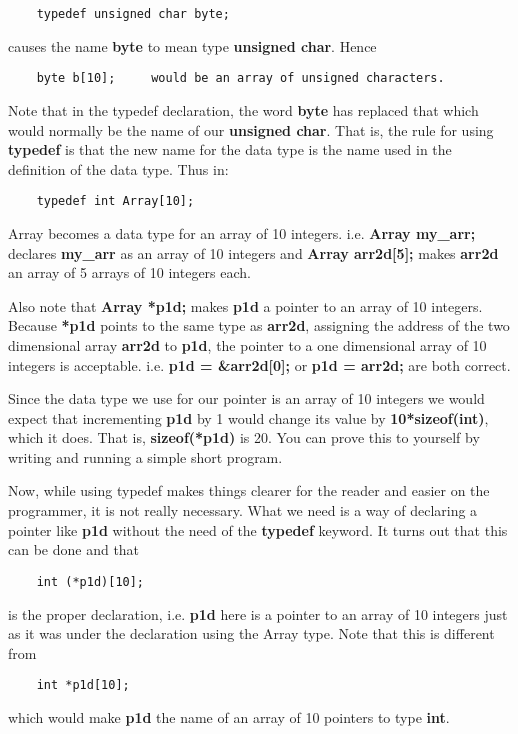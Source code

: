 \begin{verbatim}
    typedef unsigned char byte;
\end{verbatim}

causes the name \textbf{byte} to mean type \textbf{unsigned char}. Hence

\begin{verbatim}
    byte b[10];     would be an array of unsigned characters.
\end{verbatim}

Note that in the typedef declaration, the word \textbf{byte} has
replaced that which would normally be the name of our \textbf{unsigned
char}. That is, the rule for using \textbf{typedef} is that the new name
for the data type is the name used in the definition of the data type.
Thus in:

\begin{verbatim}
    typedef int Array[10];
\end{verbatim}

Array becomes a data type for an array of 10 integers. i.e.
\textbf{Array my\_arr;} declares \textbf{my\_arr} as an array of 10
integers and \textbf{Array arr2d{[}5{]};} makes \textbf{arr2d} an array
of 5 arrays of 10 integers each.

Also note that \textbf{Array *p1d;} makes \textbf{p1d} a pointer to an
array of 10 integers. Because \textbf{*p1d} points to the same type as
\textbf{arr2d}, assigning the address of the two dimensional array
\textbf{arr2d} to \textbf{p1d}, the pointer to a one dimensional array
of 10 integers is acceptable. i.e. \textbf{p1d = \&arr2d{[}0{]};} or
\textbf{p1d = arr2d;} are both correct.

Since the data type we use for our pointer is an array of 10 integers we
would expect that incrementing \textbf{p1d} by 1 would change its value
by \textbf{10*sizeof(int)}, which it does. That is,
\textbf{sizeof(*p1d)} is 20. You can prove this to yourself by writing
and running a simple short program.

Now, while using typedef makes things clearer for the reader and easier
on the programmer, it is not really necessary. What we need is a way of
declaring a pointer like \textbf{p1d} without the need of the
\textbf{typedef} keyword. It turns out that this can be done and that

\begin{verbatim}
    int (*p1d)[10];
\end{verbatim}

is the proper declaration, i.e. \textbf{p1d} here is a pointer to an
array of 10 integers just as it was under the declaration using the
Array type. Note that this is different from

\begin{verbatim}
    int *p1d[10];
\end{verbatim}

which would make \textbf{p1d} the name of an array of 10 pointers to
type \textbf{int}.

\begin{comment}
\href{ch9x.htm}{Chapter 9: Pointers and Dynamic Allocation of Memory}

\href{pointers.htm}{Back to Table of Contents}
\end{comment}
